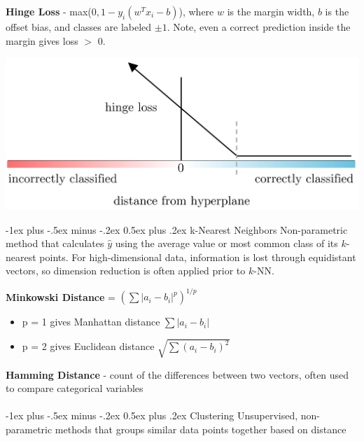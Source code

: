 \documentclass[10pt,landscape]{article}
\makeatletter
\renewcommand{\section}{\@startsection{section}{1}{0mm}%
                                {-1ex plus -.5ex minus -.2ex}%
                                {0.5ex plus .2ex}%
                                {\normalfont\large\bfseries}}
\makeatother
\begin{document}
\begin{multicols}{3}
\textbf{Hinge Loss} - max($0,1-y_i(w^T x_i - b)$), where 
$w$ is the margin width, $b$ is the offset bias, and classes are labeled $\pm1$. Note, even a correct prediction inside the margin gives loss $>$ 0.
\vspace{-1mm}
\begin{center}
    \includegraphics[scale = .105]{images/hingeloss3.JPG}
\end{center}
\vspace{-3.5mm}
\section{k-Nearest Neighbors}
Non-parametric method that calculates $\hat{y}$ using the average value or most common class of its $k$-nearest points. For high-dimensional data, information is lost through equidistant vectors, so dimension reduction is often applied prior to $k$-NN.

\textbf{Minkowski Distance} = $(\sum|a_i - b_i|^p)^{1/p}$
\begin{itemize}[label={--},leftmargin=4mm]
\itemsep -.4mm 
\item p = 1 gives Manhattan distance ${\sum|a_i - b_i|}$
\item p = 2 gives Euclidean distance $\sqrt{\sum(a_i - b_i)^2}$
\end{itemize}

\textbf{Hamming Distance} - count of the differences between two vectors, often used to compare categorical variables \\

\columnbreak
\textcolor{white}{.}\vspace{-5mm}\\ %
\section{Clustering}
Unsupervised, non-parametric methods that groups similar data points together based on distance

\end{multicols}
\end{document}
